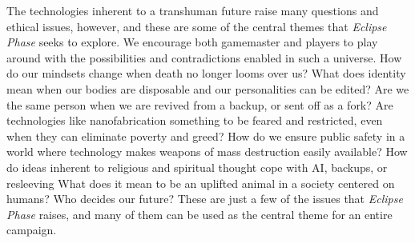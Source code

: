 The technologies inherent to a transhuman future raise many questions and ethical issues, however, and these are some of the central themes that \textit{Eclipse } \textit{Phase} seeks to explore. We encourage both gamemaster and players to play around with the possibilities and contradictions enabled in such a universe. How do our mindsets change when death no longer looms over us? What does identity mean when our bodies are disposable and our personalities can be edited? Are we the same person when we are revived from a backup, or sent off as a fork? Are technologies like nanofabrication something to be feared and restricted, even when they can eliminate poverty and greed? How do we ensure public safety in a world where technology makes weapons of mass destruction easily available? How do ideas inherent to religious and spiritual thought cope with AI, backups, or resleeving What does it mean to be an uplifted animal in a society centered on humans? Who decides our future? These are just a few of the issues that \textit{Eclipse Phase} raises, and many of them can be used as the central theme for an entire campaign. 